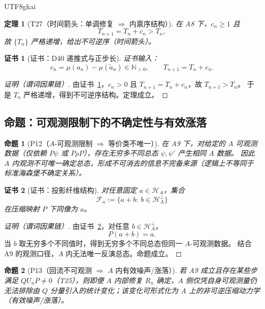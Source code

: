 \documentclass[12pt]{article}
\newtheorem{theorem}{定理}[section]
\newtheorem{proposition}{命题}[section]
\newtheorem{Certificate}{证书}[section]
\begin{document}
\begin{CJK*}{UTF8}{gkai}
\begin{theorem}[T27（时间箭头：单调修复 $\Rightarrow$ 内禀序结构）]
\label{thm:T27}
在 A8 下，$c_n\ge 1$ 且
\[
T_{n+1}=T_n+c_n>T_n,
\]
故 $\{T_n\}$ 严格递增，给出不可逆序（时间箭头）。
\end{theorem}

\begin{Certificate}[证书：D40 递推式与正步长]
\label{cert:T27}
证书输入：
\[
c_n=\mu(a_n)-\mu(\tilde a_n)\in\mathbb N_{>0},
\qquad
T_{n+1}=T_n+c_n.
\]
\end{Certificate}

\begin{proof}[证明（谓词因果链）]
由证书~\ref{cert:T27}，$c_n>0$ 且 $T_{n+1}=T_n+c_n$，故 $T_{n+1}>T_n$。
于是 $T_n$ 严格递增，得到不可逆序结构。定理成立。
\end{proof}

\subsection{命题：可观测限制下的不确定性与有效涨落}

\begin{proposition}[P12（$A$-可观测限制 $\Rightarrow$ 等价类不唯一）]
\label{prop:P12}
在 A9 下，对给定的 $A$ 可观测数据（仅依赖 $P\psi$ 或 $P\rho P$），存在无穷多不同总态 $\psi,\psi'$ 产生相同 $A$ 数据。
因此 $A$ 内观测不可唯一确定总态，形成不可消去的信息不完备来源（逻辑上不等同于标准海森堡不确定关系）。
\end{proposition}

\begin{Certificate}[证书：投影纤维结构]
\label{cert:P12}
对任意固定 $a\in\mathcal H_A$，集合
\[
\mathcal F_a:=\{a+b:\ b\in\mathcal H_A^\perp\}
\]
在压缩映射 $P$ 下同像为 $a$。
\end{Certificate}

\begin{proof}[证明（谓词因果链）]
由证书~\ref{cert:P12}，对任意 $b\in\mathcal H_A^\perp$，
\[
P(a+b)=a.
\]
当 $b$ 取无穷多个不同值时，得到无穷多个不同总态但同一 $A$-可观测数据。
结合 A9 的观测口径，$A$ 内无法唯一反演总态。命题成立。
\end{proof}

\begin{proposition}[P13（回流不可观测 $\Rightarrow$ $A$ 内有效噪声/涨落）]
\label{prop:P13}
若 A9 成立且存在某些步满足 $Q U_n P\neq 0$（T25），则即便 $A$ 内部修复 $R_n$ 确定，$A$ 侧仅凭自身可观测量仍无法排除由 $Q$ 分量引入的统计变化；该变化可形式化为 $A$
  上的非可逆压缩动力学（有效噪声/涨落）。
\end{proposition}


\end{CJK*}
\end{document}

